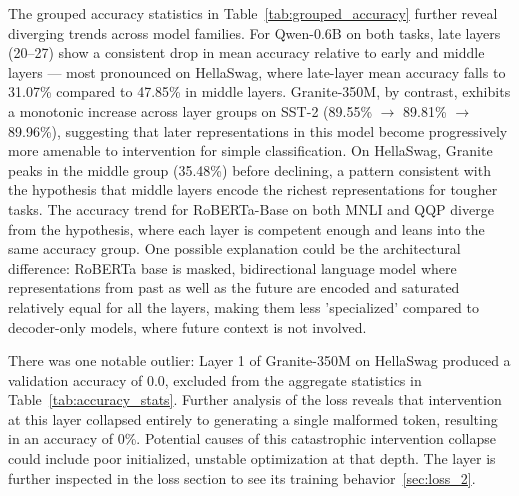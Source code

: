 \documentclass[conference]{IEEEtran}
\begin{document}
	The grouped accuracy statistics in Table~\ref{tab:grouped_accuracy} further reveal diverging trends across model families. For Qwen-0.6B on both tasks, late layers (20--27) show a consistent drop in mean accuracy relative to early and middle layers — most pronounced on HellaSwag, where late-layer mean accuracy falls to 31.07\% compared to 47.85\% in middle layers. Granite-350M, by contrast, exhibits a monotonic increase across layer groups on SST-2 (89.55\% $\rightarrow$ 89.81\% $\rightarrow$ 89.96\%), suggesting that later representations in this model become progressively more amenable to intervention for simple classification. On HellaSwag, Granite peaks in the middle group (35.48\%) before declining, a pattern consistent with the hypothesis that middle layers encode the richest representations for tougher tasks. The accuracy trend for RoBERTa-Base on both MNLI and QQP diverge from the hypothesis, where each layer is competent enough and leans into the same accuracy group. One possible explanation could be the architectural difference: RoBERTa base is masked, bidirectional language model where representations from past as well as the future are encoded and saturated relatively equal for all the layers, making them less 'specialized' compared to decoder-only models, where future context is not involved.
	
	\label{sec:loss}
	There was one notable outlier: Layer 1 of Granite-350M on HellaSwag produced a validation accuracy of 0.0, excluded from the aggregate statistics in Table~\ref{tab:accuracy_stats}. Further analysis of the loss reveals that intervention at this layer collapsed entirely to generating a single malformed token, resulting in an accuracy of 0\%. Potential causes of this catastrophic intervention collapse could include poor initialized, unstable optimization at that depth. The layer is further inspected in the loss section to see its training behavior~\ref{sec:loss_2}.
	
\end{document}

